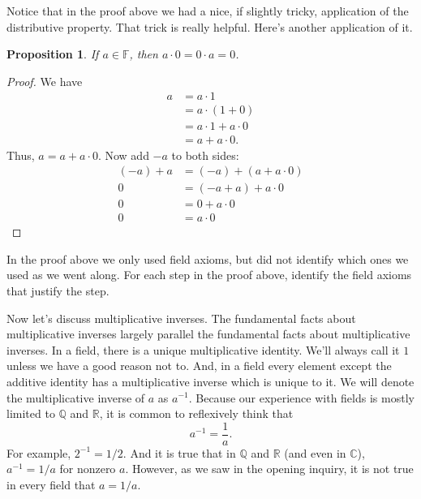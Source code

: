 \documentclass[11pt]{article}
\newenvironment{task}
	{\begin{mdframed}[linecolor=lightgray, linewidth=3pt]\raggedright}
	{\end{mdframed}}
\newtheorem{proposition}[theorem]{Proposition}
\theoremstyle{definition}
\begin{document}
Notice that in the proof above we had a nice, if slightly tricky, application of the distributive property. That trick is really helpful. Here's another 
application of it.

\begin{proposition}
  If $a\in\mathbb{F}$, then $a\cdot 0 = 0 \cdot a = 0$.
\end{proposition}
\begin{proof}
  We have 
  \begin{align*}
  a &= a\cdot 1\\
    &= a\cdot (1+0)\\
    &= a\cdot 1 + a\cdot 0\\
    &= a + a\cdot 0.
  \end{align*}
  Thus, $a = a + a \cdot 0$. Now add $-a$ to both sides:
  \begin{align*}
   (-a) + a &= (-a) + (a + a\cdot 0)\\
   0 &= (-a + a) + a\cdot 0\\
   0 &= 0 + a\cdot 0\\
   0 &= a\cdot 0
  \end{align*}
\end{proof}

\begin{task}
  In the proof above we only used field axioms, but did not identify which ones we used as we went along. For each step in the proof above, identify the
  field axioms that justify the step.
\end{task}

Now let's discuss multiplicative inverses. The fundamental facts about multiplicative inverses largely parallel the fundamental facts about multiplicative inverses. In a field, there is a unique
multiplicative identity. We'll always call it $1$ unless we have a good reason not to. And, in a field every element except the additive identity has a multiplicative inverse which is unique to it.
We will denote the multiplicative inverse of $a$ as $a^{-1}$. Because our experience with fields is mostly limited to $\mathbb{Q}$ and $\mathbb{R}$, it is common to reflexively think that 
\[ a^{-1} = \frac{1}{a}. \]
For example, $2^{-1} = 1/2$. And it is true that in $\mathbb{Q}$ and $\mathbb{R}$ (and even in $\mathbb{C}$), $a^{-1} = 1/a$ for nonzero $a$. However, as we saw 
in the opening inquiry, it is not true in every field that $a = 1/a$. 
\end{document}
